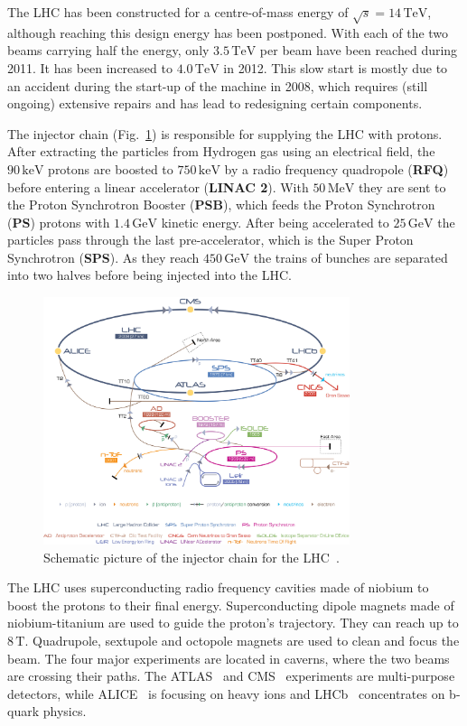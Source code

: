 The LHC has been constructed for a centre-of-mass energy of $\sqrt{s} = 14\,\text{TeV}$, although reaching this design energy has been postponed. With each of the two beams carrying half the energy, only $3.5\,\text{TeV}$ per beam have been reached during 2011. It has been increased to $4.0\,\text{TeV}$ in 2012. This slow start is mostly due to an accident during the start-up of the machine in 2008, which requires (still ongoing) extensive repairs and has lead to redesigning certain components.

The injector chain (Fig.~\ref{fig:injchain}) is responsible for supplying the LHC with protons. After extracting the particles from Hydrogen gas using an electrical field, the $90\,\text{keV}$ protons are boosted to $750\,\text{keV}$ by a radio frequency quadropole (\textbf{RFQ}) before entering a linear accelerator (\textbf{LINAC 2}). With $50\,\text{MeV}$ they are sent to the Proton Synchrotron Booster (\textbf{PSB}), which feeds the Proton Synchrotron (\textbf{PS}) protons with $1.4\,\text{GeV}$ kinetic energy. After being accelerated to $25\,\text{GeV}$ the particles pass through the last pre-accelerator, which is the Super Proton Synchrotron (\textbf{SPS}). As they reach $450\,\text{GeV}$ the trains of bunches are separated into two halves before being injected into the LHC.

\begin{figure}[ht!]
  \centering
  \includegraphics[width=0.8\textwidth]{plots/lhcinjectorchain.jpg}
  \caption{Schematic picture of the injector chain for the LHC~\cite{injchain}.}
  \label{fig:injchain}
\end{figure}

The LHC uses superconducting radio frequency cavities made of niobium to boost the protons to their final energy. Superconducting dipole magnets made of niobium-titanium are used to guide the proton's trajectory. They can reach up to $8\,\text{T}$. Quadrupole, sextupole and octopole magnets are used to clean and focus the beam. The four major experiments are located in caverns, where the two beams are crossing their paths. The ATLAS~\cite{atlasjinst} and CMS~\cite{cmsjinst} experiments are multi-purpose detectors, while ALICE~\cite{alicejinst} is focusing on heavy ions and LHCb~\cite{lhcbjinst} concentrates on b-quark physics.



